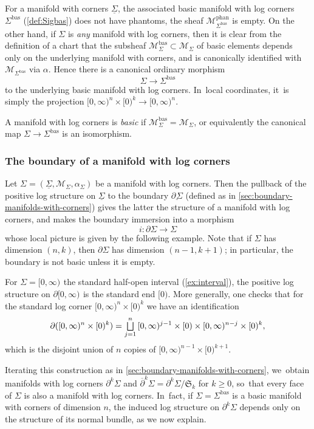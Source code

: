 \documentclass[JEP,XML,SOM,Unicode,NoFloatCountersInSection,published]{cedram}
\let\oldbigsqcup\bigsqcup
\renewcommand{\bigsqcup}{\mathop{\textstyle\oldbigsqcup}\displaylimits}
\theoremstyle{definition}
\theoremstyle{remark}
\newenvironment{example}
  {\pushQED{\qed}\renewcommand{\qedsymbol}{$\lozenge$}\examplex}
  {\popQED\endexamplex}
\let\defn\emph
\newcommand{\model}[2]{\halfspc{#1}\times[0)^{#2}}
\newcommand{\halfspc}[1]{[0,\infty)^{#1}}
\renewcommand{\ge}{\geqslant}
\newcommand{\cM}{\mathscr{M}}
\newcommand{\cMbas}{\mathscr{M}^{\mathrm{bas}}}
\newcommand{\cMphan}{\mathscr{M}^{\mathrm{phan}}}
\newcommand{\Sig}{\Sigma}
\newcommand{\uSig}{\underline{\Sigma}}
\newcommand{\bas}[1]{{#1}^{\mathrm{bas}}}
\newcommand{\Sigbas}{\bas{\Sig}}
\newcommand{\ubdSig}[1][]{\underline{\partial^{#1}\Sigma}}
\newcommand{\bdSig}[1][]{\partial^{#1}\Sigma}
\newcommand{\symgp}[1]{\mathfrak{S}_{#1}}
\begin{document}
For a manifold with corners $\uSig$, the associated basic manifold with log corners $\Sigbas$ (\autoref{def:Sigbas}) does not have phantoms, \ie the sheaf $\cMphan_{\Sigbas}$ is empty. On the other hand, if $\Sig$ is \emph{any} manifold with log corners, then it is clear from the definition of a chart that the subsheaf $\cMbas_{\Sig}\subset \cM_\Sig$ of basic elements depends only on the underlying manifold with corners, and is canonically identified with $\cM_{\Sigbas}$ via $\alpha$. Hence there is a canonical ordinary morphism
\[
\Sig \to \Sigbas
\]
to the underlying basic manifold with log corners. In~local coordinates, it~is simply the projection $\halfspc{n}\times[0)^k\to \halfspc{n}$.

\begin{definition}
A manifold with log corners is \defn{basic} if $\cMbas_{\Sig} = \cM_{\Sig}$, or equivalently the canonical map $\Sig \to \Sigbas$ is an isomorphism.
\end{definition}

\subsubsection{The boundary of a manifold with log corners}

Let $\Sig = (\uSig,\cM_\Sig,\alpha_\Sig)$ be a manifold with log corners. Then the pullback of the positive log structure on $\uSig$ to the boundary $\ubdSig$ (defined as in \autoref{sec:boundary-manifolds-with-corners}) gives the latter the structure of a manifold with log corners, and makes the boundary immersion into a morphism
\[
i\colon\partial\Sig\to \Sig
\]
whose local picture is given by the following example. Note that if $\Sig$ has dimension $(n,k)$, then $\partial\Sig$ has dimension $(n-1,k+1)$; in particular, the boundary is not basic unless it is empty.

\begin{example}
For $\Sig=\halfspc{}$ the standard half-open interval (\autoref{ex:interval}), the positive log structure on $\partial\halfspc{}$ is the standard end $[0)$. More generally, one checks that for the standard log corner $\model{n}{k}$ we have an identification
\[
\partial(\model{n}{k}) = \bigsqcup_{j=1}^n \, \halfspc{j-1}\times [0) \times \halfspc{n-j}\times [0)^k,
\]
which is the disjoint union of $n$ copies of $\model{n-1}{k+1}$.
\end{example}

Iterating this construction as in \autoref{sec:boundary-manifolds-with-corners}, we~obtain manifolds with log corners $\bdSig[k]$ and $\overline{\partial}^k\Sig = \bdSig[k]/\symgp{k}$ for $k \ge 0$, so~that every face of $\Sig$ is also a manifold with log corners. In~fact, if $\Sig=\Sigbas$ is a basic manifold with corners of dimension $n$, the induced log structure on $\bdSig[k]$ depends only on the structure of its normal bundle, as we now explain.
\end{document}
